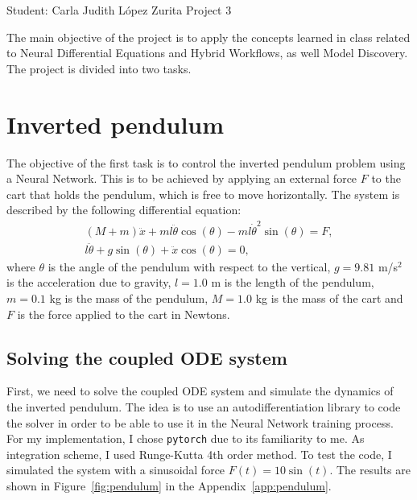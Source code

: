\documentclass[unicode,11pt,a4paper,oneside,numbers=endperiod,openany]{scrartcl}
\begin{document}
\setassignment
{}

            {Student: Carla Judith L\'opez Zurita}
            {}{Project 3}{}
\newline

The main objective of the project is to apply the concepts learned in class
related to Neural Differential Equations and Hybrid Workflows, as well Model
Discovery. The project is divided into two tasks.


\section{Inverted pendulum}\label{sec:task1}
The objective of the first task is to control the inverted pendulum problem using a
Neural Network. This is to be achieved by applying an 
external force $F$ to the cart that holds the pendulum, which is free to move
horizontally.
The system is described by the following differential equation:
\begin{align}
    (M+m) \ddot{x} + m l \ddot{\theta} \cos(\theta) - m l \dot{\theta}^2 \sin(\theta) = F, \\
    l \ddot{\theta} + g \sin(\theta) + \ddot{x} \cos(\theta) = 0,
\end{align}
where $\theta$ is the angle of the pendulum with respect to the vertical,
$g=9.81$ m/s$^2$ is the acceleration due to gravity, $l=1.0$ m is the length of
the pendulum, $m=0.1$ kg is the mass of the pendulum, $M=1.0$ kg is the mass of
the cart and $F$ is the force applied to the cart in Newtons.

\subsection*{Solving the coupled ODE system}
First, we need to solve the coupled ODE system and simulate the dynamics of the
inverted pendulum.
The idea is to use an autodifferentiation library to code the solver in order to
be able to use it in the Neural Network training process. 
For my implementation, I chose \texttt{pytorch} due to its familiarity to me.
As integration scheme, I used Runge-Kutta 4th order method. To test the
code, I simulated the system with a sinusoidal force $F(t) = 10
\sin(t)$.
The results are shown in Figure~\ref{fig:pendulum} in the Appendix~\ref{app:pendulum}.
\end{document}
